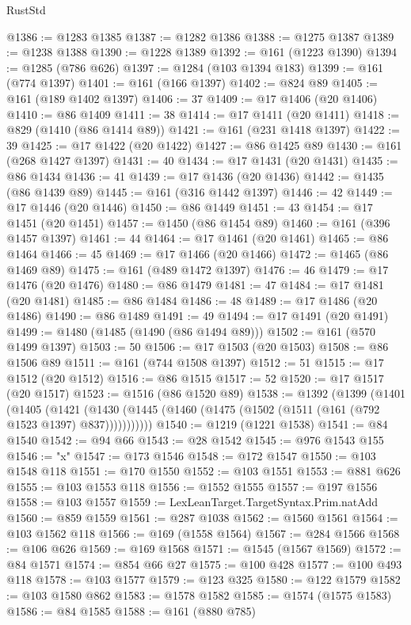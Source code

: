 \begin{lexlean}{RustStd}
\begin{coremodule}
{\begin{coremodule}
{{{{{{{{{{{{{{{{{{{{{{{{{{@1386 := @1283 @1385
@1387 := @1282 @1386
@1388 := @1275 @1387
@1389 := @1238 @1388
@1390 := @1228 @1389
@1392 := @161 (@1223 @1390)
@1394 := @1285 (@786 @626)
@1397 := @1284 (@103 @1394 @183)
@1399 := @161 (@774 @1397)
@1401 := @161 (@166 @1397)
@1402 := @824 @89
@1405 := @161 (@189 @1402 @1397)
@1406 := 37
@1409 := @17 @1406 (@20 @1406)
@1410 := @86 @1409
@1411 := 38
@1414 := @17 @1411 (@20 @1411)
@1418 := @829 (@1410 (@86 @1414 @89))
@1421 := @161 (@231 @1418 @1397)
@1422 := 39
@1425 := @17 @1422 (@20 @1422)
@1427 := @86 @1425 @89
@1430 := @161 (@268 @1427 @1397)
@1431 := 40
@1434 := @17 @1431 (@20 @1431)
@1435 := @86 @1434
@1436 := 41
@1439 := @17 @1436 (@20 @1436)
@1442 := @1435 (@86 @1439 @89)
@1445 := @161 (@316 @1442 @1397)
@1446 := 42
@1449 := @17 @1446 (@20 @1446)
@1450 := @86 @1449
@1451 := 43
@1454 := @17 @1451 (@20 @1451)
@1457 := @1450 (@86 @1454 @89)
@1460 := @161 (@396 @1457 @1397)
@1461 := 44
@1464 := @17 @1461 (@20 @1461)
@1465 := @86 @1464
@1466 := 45
@1469 := @17 @1466 (@20 @1466)
@1472 := @1465 (@86 @1469 @89)
@1475 := @161 (@489 @1472 @1397)
@1476 := 46
@1479 := @17 @1476 (@20 @1476)
@1480 := @86 @1479
@1481 := 47
@1484 := @17 @1481 (@20 @1481)
@1485 := @86 @1484
@1486 := 48
@1489 := @17 @1486 (@20 @1486)
@1490 := @86 @1489
@1491 := 49
@1494 := @17 @1491 (@20 @1491)
@1499 := @1480 (@1485 (@1490 (@86 @1494 @89)))
@1502 := @161 (@570 @1499 @1397)
@1503 := 50
@1506 := @17 @1503 (@20 @1503)
@1508 := @86 @1506 @89
@1511 := @161 (@744 @1508 @1397)
@1512 := 51
@1515 := @17 @1512 (@20 @1512)
@1516 := @86 @1515
@1517 := 52
@1520 := @17 @1517 (@20 @1517)
@1523 := @1516 (@86 @1520 @89)
@1538 := @1392
    (@1399
      (@1401
        (@1405
          (@1421 (@1430 (@1445 (@1460 (@1475 (@1502 (@1511 (@161 (@792 @1523 @1397) @837)))))))))))
@1540 := @1219 (@1221 @1538)
@1541 := @84 @1540
@1542 := @94 @66
@1543 := @28 @1542
@1545 := @976 @1543 @155
@1546 := "x"
@1547 := @173 @1546
@1548 := @172 @1547
@1550 := @103 @1548 @118
@1551 := @170 @1550
@1552 := @103 @1551
@1553 := @881 @626
@1555 := @103 @1553 @118
@1556 := @1552 @1555
@1557 := @197 @1556
@1558 := @103 @1557
@1559 := LexLeanTarget.TargetSyntax.Prim.natAdd
@1560 := @859 @1559
@1561 := @287 @1038
@1562 := @1560 @1561
@1564 := @103 @1562 @118
@1566 := @169 (@1558 @1564)
@1567 := @284 @1566
@1568 := @106 @626
@1569 := @169 @1568
@1571 := @1545 (@1567 @1569)
@1572 := @84 @1571
@1574 := @854 @66 @27
@1575 := @100 @428
@1577 := @100 @493 @118
@1578 := @103 @1577
@1579 := @123 @325
@1580 := @122 @1579
@1582 := @103 @1580 @862
@1583 := @1578 @1582
@1585 := @1574 (@1575 @1583)
@1586 := @84 @1585
@1588 := @161 (@880 @785)
}}}}}}}}}}}}}}}}}}}}}}}}}}
\end{coremodule}}
\end{coremodule}
\end{lexlean}
